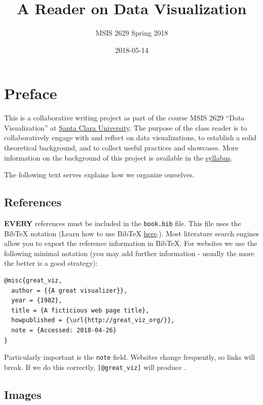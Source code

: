 \documentclass[]{book}
\title{A Reader on Data Visualization}
\author{MSIS 2629 Spring 2018}
\date{2018-05-14}
\theoremstyle{definition}
\theoremstyle{definition}
\theoremstyle{definition}
\theoremstyle{remark}
\begin{document}
\maketitle

{
\setcounter{tocdepth}{1}
\tableofcontents
}
\chapter{Preface}\label{preface}

This is a collaborative writing project as part of the course MSIS 2629
``Data Visualization'' at \href{http://www.scu.edu}{Santa Clara
University}. The purpose of the class reader is to collaboratively
engage with and reflect on data visualizations, to establish a solid
theoretical background, and to collect useful practices and showcases.
More information on the background of this project is available in the
\href{https://mschermann.github.io/msis2629spring2018}{syllabus}.

The following text serves explains how we organize ourselves.

\section{References}\label{references}

\textbf{EVERY} references must be included in the \texttt{book.bib}
file. This file uses the BibTeX notation (Learn how to use BibTeX
\href{http://www.bibtex.org/Using/}{here}.). Most literature search
engines allow you to export the reference information in BibTeX. For
websites we use the following minimal notation (you may add further
information - usually the more the better is a good strategy):

\begin{verbatim}
@misc{great_viz,
  author = {{A great visualizer}},
  year = {1982},
  title = {A ficticious web page title},
  howpublished = {\url{http://great_viz_org/}},
  note = {Accessed: 2018-04-26}
}
\end{verbatim}

Particularly important is the \texttt{note} field. Websites change
frequently, so links will break. If we do this correctly,
\texttt{{[}@great\_viz{]}} will produce \citep{great_viz}.

\section{Images}\label{images}
\end{document}
